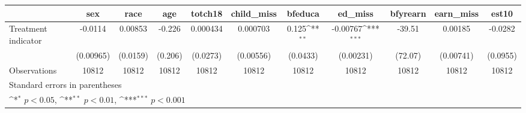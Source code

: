 {
\def\sym#1{\ifmmode^{#1}\else\(^{#1}\)\fi}
\begin{tabular}{l*{10}{c}}
\hline\hline
                    &\multicolumn{1}{c}{sex}&\multicolumn{1}{c}{race}&\multicolumn{1}{c}{age}&\multicolumn{1}{c}{totch18}&\multicolumn{1}{c}{child\_miss}&\multicolumn{1}{c}{bfeduca}&\multicolumn{1}{c}{ed\_miss}&\multicolumn{1}{c}{bfyrearn}&\multicolumn{1}{c}{earn\_miss}&\multicolumn{1}{c}{est10}\\
\hline
Treatment indicator &     -0.0114         &     0.00853         &      -0.226         &    0.000434         &    0.000703         &       0.125\sym{**} &    -0.00767\sym{***}&      -39.51         &     0.00185         &     -0.0282         \\
                    &   (0.00965)         &    (0.0159)         &     (0.206)         &    (0.0273)         &   (0.00556)         &    (0.0433)         &   (0.00231)         &     (72.07)         &   (0.00741)         &    (0.0955)         \\
\hline
Observations        &       10812         &       10812         &       10812         &       10812         &       10812         &       10812         &       10812         &       10812         &       10812         &       10812         \\
\hline\hline
\multicolumn{11}{l}{\footnotesize Standard errors in parentheses}\\
\multicolumn{11}{l}{\footnotesize \sym{*} \(p<0.05\), \sym{**} \(p<0.01\), \sym{***} \(p<0.001\)}\\
\end{tabular}
}
